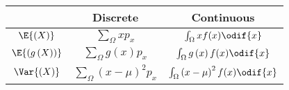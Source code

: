 \documentclass{article}
\begin{document}
\begin{multicols}{3}
\begin{minipage}{70mm}
    \begin{table}[H]
        \centering
        \scriptsize
        \begin{tabular}{c c c }
            \toprule
                                                     & \textbf{Discrete}                              & \textbf{Continuous}                                    \\
            \midrule
            \(\E{\left( X \right)}\)                 & \(\sum_{\Omega} xp_x\)                         & \(\int_{\Omega} xf(x)\odif{x}\)                        \\
            \(\E{\left( g\left( X \right) \right)}\) & \(\sum_{\Omega} g\left( x \right)p_x\)         & \(\int_{\Omega} g\left( x \right)f(x)\odif{x}\)        \\
            \(\Var{\left( X \right)}\)               & \(\sum_{\Omega} \left( x - \mu \right)^2 p_x\) & \(\int_{\Omega} \left( x - \mu \right)^2f(x)\odif{x}\) \\
            \bottomrule
        \end{tabular}
    \end{table}
\end{minipage}
\end{multicols}
\end{document}
